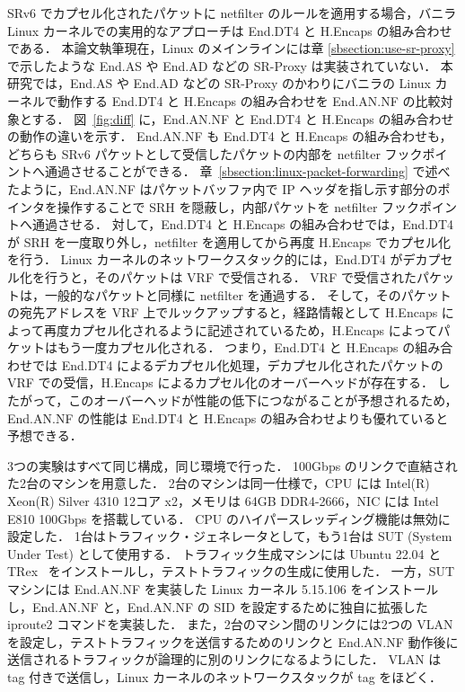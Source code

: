 SRv6 でカプセル化されたパケットに netfilter のルールを適用する場合，バニラ Linux カーネルでの実用的なアプローチは End.DT4 と H.Encaps の組み合わせである．
本論文執筆現在，Linux のメインラインには章 \ref{sbsection:use-sr-proxy} で示したような End.AS や End.AD などの SR-Proxy は実装されていない．
本研究では，End.AS や End.AD などの SR-Proxy のかわりにバニラの Linux カーネルで動作する End.DT4 と H.Encaps の組み合わせを End.AN.NF の比較対象とする．
図~\ref*{fig:diff} に，End.AN.NF と End.DT4 と H.Encaps の組み合わせの動作の違いを示す．
End.AN.NF も End.DT4 と H.Encaps の組み合わせも，どちらも SRv6 パケットとして受信したパケットの内部を netfilter フックポイントへ通過させることができる．
章~\ref{sbsection:linux-packet-forwarding} で述べたように，End.AN.NF はパケットバッファ内で IP ヘッダを指し示す部分のポインタを操作することで SRH を隠蔽し，内部パケットを netfilter フックポイントへ通過させる．
対して，End.DT4 と H.Encaps の組み合わせでは，End.DT4 が SRH を一度取り外し，netfilter を適用してから再度 H.Encaps でカプセル化を行う．
Linux カーネルのネットワークスタック的には，End.DT4 がデカプセル化を行うと，そのパケットは VRF で受信される．
VRF で受信されたパケットは，一般的なパケットと同様に netfilter を通過する．
そして，そのパケットの宛先アドレスを VRF 上でルックアップすると，経路情報として H.Encaps によって再度カプセル化されるように記述されているため，H.Encaps によってパケットはもう一度カプセル化される．
つまり，End.DT4 と H.Encaps の組み合わせでは End.DT4 によるデカプセル化処理，デカプセル化されたパケットの VRF での受信，H.Encaps によるカプセル化のオーバーヘッドが存在する．
したがって，このオーバーヘッドが性能の低下につながることが予想されるため，End.AN.NF の性能は End.DT4 と H.Encaps の組み合わせよりも優れていると予想できる．

3つの実験はすべて同じ構成，同じ環境で行った．
100Gbps のリンクで直結された2台のマシンを用意した．
2台のマシンは同一仕様で，CPU には Intel(R) Xeon(R) Silver 4310 12コア x2，メモリは 64GB DDR4-2666，NIC には Intel E810 100Gbps を搭載している．
CPU のハイパースレッディング機能は無効に設定した．
1台はトラフィック・ジェネレータとして，もう1台は SUT (System Under Test) として使用する．
トラフィック生成マシンには Ubuntu 22.04 と TRex~\cite{trex} をインストールし，テストトラフィックの生成に使用した．
一方，SUT マシンには End.AN.NF を実装した Linux カーネル 5.15.106 をインストールし，End.AN.NF と，End.AN.NF の SID を設定するために独自に拡張した iproute2 コマンドを実装した．
また，2台のマシン間のリンクには2つの VLAN を設定し，テストトラフィックを送信するためのリンクと End.AN.NF 動作後に送信されるトラフィックが論理的に別のリンクになるようにした．
VLAN は tag 付きで送信し，Linux カーネルのネットワークスタックが tag をほどく．

